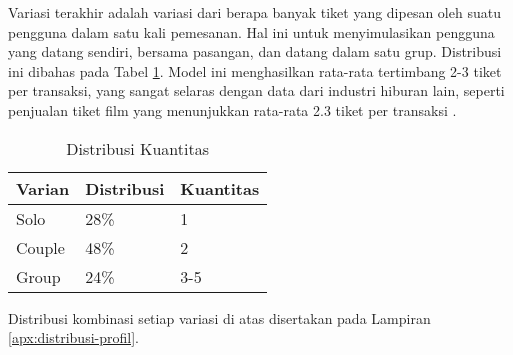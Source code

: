 Variasi terakhir adalah variasi dari berapa banyak tiket yang dipesan oleh suatu pengguna dalam satu kali pemesanan. Hal ini untuk menyimulasikan pengguna yang datang sendiri, bersama pasangan, dan datang dalam satu grup. Distribusi ini dibahas pada Tabel \ref{table:distribusi-kuantitas}. Model ini menghasilkan rata-rata tertimbang 2-3 tiket per transaksi, yang sangat selaras dengan data dari industri hiburan lain, seperti penjualan tiket film yang menunjukkan rata-rata 2.3 tiket per transaksi \parencite{vista2025}.

\begin{table}[h]
    \centering
    \caption{Distribusi Kuantitas}
    \label{table:distribusi-kuantitas}
    \begin{tabular}{|l|l|l|}
        \hline
        \textbf{Varian} & \textbf{Distribusi} & \textbf{Kuantitas} \\
        \hline
        Solo            & 28\%                & 1                  \\
        \hline
        Couple          & 48\%                & 2                  \\
        \hline
        Group           & 24\%                & 3-5                \\
        \hline
    \end{tabular}
\end{table}

Distribusi kombinasi setiap variasi di atas disertakan pada Lampiran \ref{apx:distribusi-profil}.